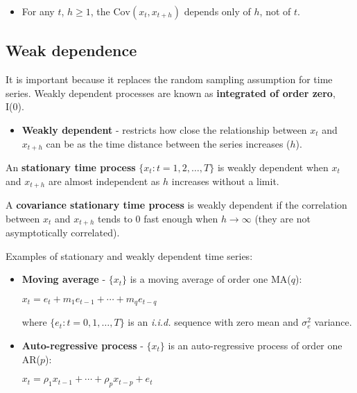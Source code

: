 \documentclass[10pt, a4paper, landscape]{article}
\newcommand{\Cov}{\mathrm{Cov}}
\begin{document}
\begin{multicols}{3}
\begin{itemize}[leftmargin=*]
\begin{itemize}[leftmargin=*]
				\item For any $t$, $h \geq 1$, the $\Cov(x_{t}, x_{t + h})$ depends only of $h$, not of $t$.
			\end{itemize}
		\end{itemize}
		
		\subsection*{Weak dependence}
		
		It is important because it replaces the random sampling assumption for time series. Weakly dependent processes are known as \textbf{integrated of order zero}, I(0).
		
		\begin{itemize}[leftmargin=*]
			\item \textbf{Weakly dependent} - restricts how close the relationship between $x_{t}$ and $x_{t + h}$ can be as the time distance between the series increases ($h$).
		\end{itemize}
		
		An \textbf{stationary time process} $\lbrace x_{t} : t = 1, 2, \ldots, T \rbrace$ is weakly dependent when $x_{t}$ and $x_{t + h}$ are almost independent as $h$ increases without a limit.
		
		A \textbf{covariance stationary time process} is weakly dependent if the correlation between $x_{t}$ and $x_{t + h}$ tends to $0$ fast enough when $h \rightarrow \infty$ (they are not asymptotically correlated).
		
		Examples of stationary and weakly dependent time series:
		
		\begin{itemize}[leftmargin=*]
			\item \textbf{Moving average} - $\lbrace x_{t} \rbrace$ is a moving average of order one MA($q$):
			
			\begin{center}
				$x_{t} = e_{t} + m_{1} e_{t - 1} + \cdots + m_{q} e_{t - q}$
			\end{center}
			
			where $\lbrace e_{t} : t = 0, 1, \ldots, T \rbrace$ is an \textsl{i.i.d.} sequence with zero mean and $\sigma^{2}_{e}$ variance.
			
			\item \textbf{Auto-regressive process} - $\lbrace x_{t} \rbrace$ is an auto-regressive process of order one AR($p$):
			
			\begin{center}
				$x_{t} = \rho_{1} x_{t - 1} + \cdots + \rho_{p} x_{t - p}+ e_{t}$
			\end{center}
			

\end{itemize}
\end{multicols}
\end{document}
